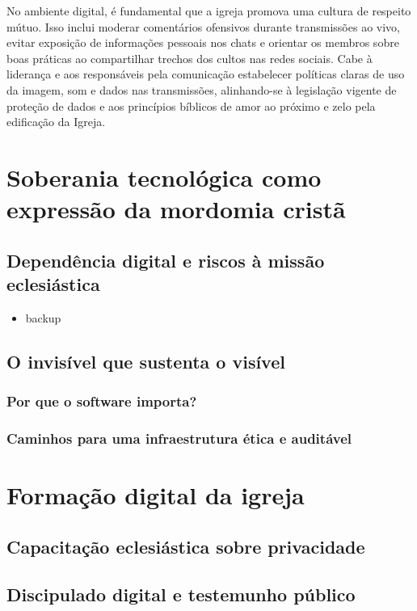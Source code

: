 No ambiente digital, é fundamental que a igreja promova uma cultura de respeito mútuo. Isso inclui moderar comentários ofensivos durante transmissões ao vivo, evitar exposição de informações pessoais nos chats e orientar os membros sobre boas práticas ao compartilhar trechos dos cultos nas redes sociais. Cabe à liderança e aos responsáveis pela comunicação estabelecer políticas claras de uso da imagem, som e dados nas transmissões, alinhando-se à legislação vigente de proteção de dados e aos princípios bíblicos de amor ao próximo e zelo pela edificação da Igreja.

\section{Soberania tecnológica como expressão da mordomia cristã}

\subsection{Dependência digital e riscos à missão eclesiástica}

\begin{itemize}
    \item backup
\end{itemize}

\subsection{O invisível que sustenta o visível}

\subsubsection{Por que o software importa?}

\subsubsection{Caminhos para uma infraestrutura ética e auditável}

\section{Formação digital da igreja}

\subsection{Capacitação eclesiástica sobre privacidade}

\subsection{Discipulado digital e testemunho público}
